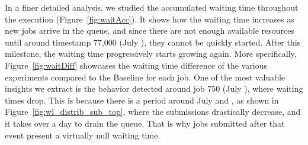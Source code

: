 \documentclass[a4paper,fleqn]{cas-dc}
\begin{document}

In a finer detailed analysis, we studied the accumulated waiting time throughout the execution (Figure~\ref{fig:waitAcc}).
It shows how the waiting time increases as new jobs arrive in the queue, and since there are not enough available resources until around timestamp 77,000 (July ), they cannot be quickly started.
After this milestone, the waiting time progressively starts growing again. 
More specifically, Figure~\ref{fig:waitDiff} showcases the waiting time difference of the various experiments compared to the Baseline for each job.
One of the most valuable insights we extract is the behavior detected around job $750$ (July ), where waiting times drop.
This is because there is a period around July  and , as shown in Figure~\ref{fig:wl_distrib_sub_top}, where the submissions drastically decrease, and it takes over a day to drain the queue.
That is why jobs submitted after that event present a virtually null waiting time.
\end{document}
